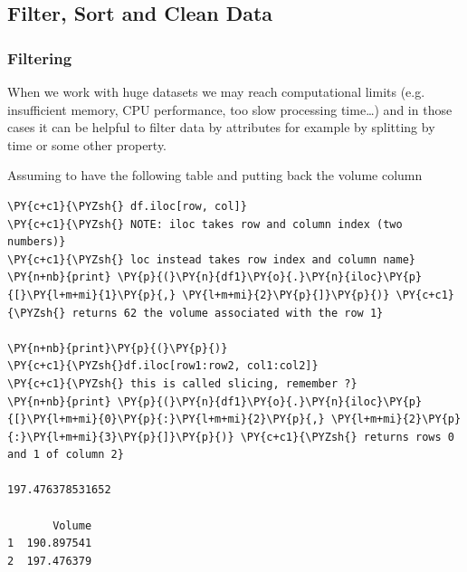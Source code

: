 \subsection{Filter, Sort and Clean Data}\label{filter-sort-and-clean-data}

\subsubsection{Filtering}\label{filtering}

When we work with huge datasets we may reach computational limits (e.g. insufficient memory, CPU performance, 
too slow processing time\ldots) and in those cases it can be helpful to filter data by attributes for 
example by splitting by time or some other property.

Assuming to have the following table and putting back the volume column

\begin{tcolorbox}[breakable, size=fbox, boxrule=1pt, pad at break*=1mm,colback=cellbackground, colframe=cellborder]
\begin{Verbatim}[commandchars=\\\{\}]
\PY{c+c1}{\PYZsh{} df.iloc[row, col]}
\PY{c+c1}{\PYZsh{} NOTE: iloc takes row and column index (two numbers)}
\PY{c+c1}{\PYZsh{} loc instead takes row index and column name}
\PY{n+nb}{print} \PY{p}{(}\PY{n}{df1}\PY{o}{.}\PY{n}{iloc}\PY{p}{[}\PY{l+m+mi}{1}\PY{p}{,} \PY{l+m+mi}{2}\PY{p}{]}\PY{p}{)} \PY{c+c1}{\PYZsh{} returns 62 the volume associated with the row 1}

\PY{n+nb}{print}\PY{p}{(}\PY{p}{)}
\PY{c+c1}{\PYZsh{}df.iloc[row1:row2, col1:col2]}
\PY{c+c1}{\PYZsh{} this is called slicing, remember ?}
\PY{n+nb}{print} \PY{p}{(}\PY{n}{df1}\PY{o}{.}\PY{n}{iloc}\PY{p}{[}\PY{l+m+mi}{0}\PY{p}{:}\PY{l+m+mi}{2}\PY{p}{,} \PY{l+m+mi}{2}\PY{p}{:}\PY{l+m+mi}{3}\PY{p}{]}\PY{p}{)} \PY{c+c1}{\PYZsh{} returns rows 0 and 1 of column 2}

197.476378531652

       Volume
1  190.897541
2  197.476379
\end{Verbatim}
\end{tcolorbox}

